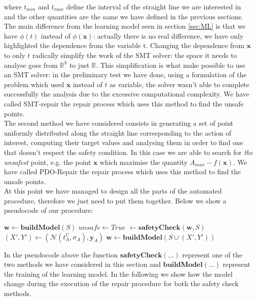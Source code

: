 where $t_{min}$ and $t_{max}$ define the interval of the straight line we are interested in and the other quantities are the same we have defined in the previous sections. The main difference from the learning model seen in section \ref{sec:ML} is that we have $\phi(t)$ instead of $\phi(\mathbf{x})$: actually there is no real difference, we have only highlighted the dependence from the variable t. Changing the dependence from $\mathbf{x}$ to only $t$ radically simplify the work of the SMT solver: the space it needs to analyse goes from $\mathbb{R}^8$ to just $\mathbb{R}$. This simplification is what make possible to use an SMT solver: in the preliminary test we have done, using a formulation of the problem which used $\mathbf{x}$ instead of $t$ as variable, the solver wasn't able to complete successfully the analysis due to the excessive computational complexity. We have called SMT-repair the repair process which uses this method to find the unsafe points.\\
The second method we have considered consists in generating a set of point uniformly distributed along the straight line corresponding to the action of interest, computing their target values and analysing them in order to find one that doesn't respect the safety condition. In this case we are able to search for \textit{the unsafest} point, e.g. the point $\mathbf{x}$ which maximise the quantity $A_{max} - f(\mathbf{x})$. We have called PDO-Repair the repair process which uses this method to find the unsafe points.\\
At this point we have managed to design all the parts of the automated procedure, therefore we just need to put them together. Below we show a pseudocode of our procedure:
\vspace{5mm}\small
\begin{algorithmic}
	\STATE $\mathbf{w} \gets \mathbf{buildModel}(S)$
	\STATE $unsafe \gets True$
	\STATE [$unsafe$ ,$t_A^U$] $\gets \mathbf{safetyCheck}(\mathbf{w}, S)$
	\STATE $(X',Y') \gets (\mathcal{N}(t_A^U,\sigma_A),\mathbf{y}_A)$
	\STATE $\mathbf{w} \gets \mathbf{buildModel}(S \cup (X',Y'))$
	\ENDIF
	\ENDFOR
	\ENDWHILE
\end{algorithmic}
\vspace{5mm}\normalsize
In the pseudocode above the function $\mathbf{safetyCheck}(...)$ represent one of the two methods we have considered in this section and $\mathbf{buildModel}(...)$ represent the training of the learning model. In the following we show how the model change during the execution of the repair procedure for both the safety check methods.
